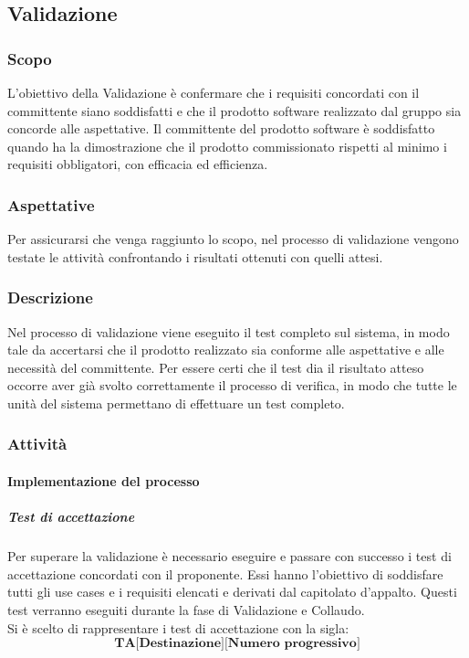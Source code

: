 \subsection{Validazione}
\subsubsection{Scopo}
L’obiettivo della Validazione è confermare che i requisiti concordati con il committente siano soddisfatti e che il prodotto software realizzato dal gruppo sia concorde alle aspettative.
Il committente del prodotto software è soddisfatto quando ha la dimostrazione che il prodotto commissionato rispetti al minimo i requisiti obbligatori, con efficacia ed efficienza.
\subsubsection{Aspettative}
Per assicurarsi che venga raggiunto lo scopo, nel processo di validazione vengono testate le attività confrontando i risultati ottenuti con quelli attesi.
\subsubsection{Descrizione}
Nel processo di validazione viene eseguito il test completo sul sistema, in modo tale da accertarsi che il prodotto realizzato sia conforme alle aspettative e alle necessità del committente. 
Per essere certi che il test dia il risultato atteso occorre aver già svolto correttamente il processo di verifica, in modo che tutte le unità del sistema permettano di effettuare un test completo.
\subsubsection{Attività}
\paragraph{Implementazione del processo}
\subparagraph*{Test di accettazione}
Per superare la validazione è necessario eseguire e passare con successo i test di accettazione concordati con il proponente. Essi hanno l'obiettivo di soddisfare tutti gli use cases e i requisiti elencati e derivati dal capitolato d'appalto. Questi test verranno eseguiti durante la fase di Validazione e Collaudo.\\
Si è scelto di rappresentare i test di accettazione con la sigla:
$$\textbf{TA[Destinazione][Numero progressivo]}$$

